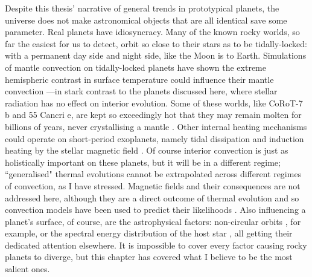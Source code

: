 

Despite this thesis' narrative of general trends in prototypical planets, the universe does not make astronomical objects that are all identical save some parameter. Real planets have idiosyncracy. Many of the known rocky worlds, so far the easiest for us to detect, orbit so close to their stars as to be tidally-locked: with a permanent day side and night side, like the Moon is to Earth. Simulations of mantle convection on tidally-locked planets have shown the extreme hemispheric contrast in surface temperature could influence their mantle convection \citep{vansummeren_mantle_2011, gelman_effects_2011, meier_hemispheric_2021}---in stark contrast to the planets discussed here, where stellar radiation has no effect on interior evolution. Some of these worlds, like CoRoT-7 b and 55 Cancri e, are kept so exceedingly hot that they may remain molten for billions of years, never crystallising a mantle \citep{leger_transiting_2009, demory_map_2016}. Other internal heating mechanisms could operate on short-period exoplanets, namely tidal dissipation \citep{driscoll_tidal_2015, renaud_increased_2018, dobos_tidal_2019} and induction heating by the stellar magnetic field \citep{kislyakova_electromagnetic_2020, grayver_interior_2022}. Of course interior convection is just as holistically important on these planets, but it will be in a different regime; ``generalised" thermal evolutions cannot be extrapolated across different regimes of convection, as I have stressed. Magnetic fields and their consequences are not addressed here, although they are a direct outcome of thermal evolution and so convection models have been used to predict their likelihoods \citep{nimmo_why_2002, gaidos_thermodynamic_2010, driscoll_thermal_2014, Foley2016, boujibar_superearth_2020, zhang_thermal_2022}. Also influencing a planet's surface, of course, are the astrophysical factors: non-circular orbits \citep{williams_earthlike_2002, dobrovolskis_spin_2007, way_effects_2017, palubski_habitability_2020}, for example, or the spectral energy distribution of the host star \citep{kasting_ultraviolet_1997, shields_effect_2013, godolt_3d_2015, eager-nash_implications_2020}, all getting their dedicated attention elsewhere. It is impossible to %
cover every factor causing rocky planets to diverge, but this chapter has covered what I believe to be the most salient ones.

